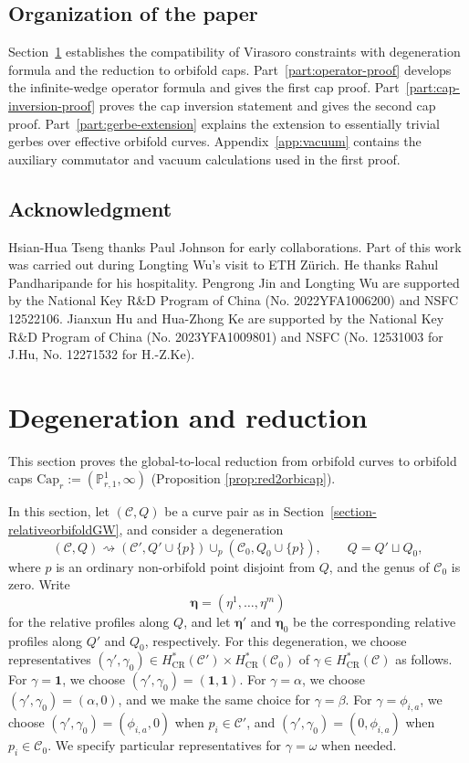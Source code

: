 \documentclass[letterpaper,12pt]{amsart}
\theoremstyle{definition}
\newcommand{\cC}{\mathcal C}
\newcommand{\CR}{\mathrm{CR}}
\newcommand{\OrbCap}{\mathrm{Cap}}
\numberwithin{equation}{section}
\begin{document}
\subsection{Organization of the paper}
Section~\ref{sec:degeneration} establishes the compatibility of Virasoro constraints with degeneration formula
and the reduction to orbifold caps.  Part~\ref{part:operator-proof} develops
the infinite-wedge operator formula and gives the first cap proof.
Part~\ref{part:cap-inversion-proof} proves the cap inversion statement and
gives the second cap proof.  Part~\ref{part:gerbe-extension} explains the
extension to essentially trivial gerbes over effective orbifold curves. Appendix~\ref{app:vacuum} contains the auxiliary commutator and vacuum
calculations used in the first proof.

\subsection{Acknowledgment}
Hsian-Hua Tseng thanks Paul Johnson for early collaborations. Part of this work was carried out during Longting Wu’s visit to ETH Z\"urich. He thanks Rahul Pandharipande for his hospitality. Pengrong Jin and Longting Wu are supported by the National Key R\&D Program of China (No. 2022YFA1006200) and NSFC 12522106. Jianxun Hu and Hua-Zhong Ke are supported by the National Key R\&D Program of China (No. 2023YFA1009801) and NSFC (No. 12531003 for J.Hu, No. 12271532 for H.-Z.Ke).

\section{Degeneration and reduction}\label{sec:degeneration}

This section proves the global-to-local reduction from orbifold curves to orbifold caps $\OrbCap_r:=(\mathbb P^1_{r,1},\infty)$ (Proposition \ref{prop:red2orbicap}).

In this section, let $(\mathcal{C},Q)$ be a curve pair as in
Section~\ref{section-relativeorbifoldGW}, and consider a degeneration
\[
(\cC,Q)
\rightsquigarrow
(\cC',Q'\cup\{p\})
\cup_p
(\cC_0,Q_0\cup\{p\}),
\qquad
Q=Q'\sqcup Q_0,
\]
where \(p\) is an ordinary non-orbifold point disjoint from \(Q\), and the
genus of \(\cC_0\) is zero.  Write
\[
\boldsymbol\eta=(\eta^1,\ldots,\eta^m)
\]
for the relative profiles along \(Q\), and let \(\boldsymbol\eta'\) and
\(\boldsymbol\eta_0\) be the corresponding relative profiles along \(Q'\) and \(Q_0\), respectively.
For this degeneration, we choose representatives
\((\gamma',\gamma_0)\in H^*_{\CR}(\cC')\times H^*_{\CR}(\cC_0)\) of
\(\gamma\in H^*_{\CR}(\cC)\) as follows.  For \(\gamma=\mathbf 1\), we choose
\((\gamma',\gamma_0)=(\mathbf 1,\mathbf 1)\).  For \(\gamma=\alpha\), we choose
\((\gamma',\gamma_0)=(\alpha,0)\), and we make the same choice for
\(\gamma=\beta\).  For \(\gamma=\phi_{i,a}\), we choose
\((\gamma',\gamma_0)=(\phi_{i,a},0)\) when \(p_i\in\cC'\), and
\((\gamma',\gamma_0)=(0,\phi_{i,a})\) when \(p_i\in\cC_0\).  We specify
particular representatives for \(\gamma=\omega\) when needed.
\end{document}
